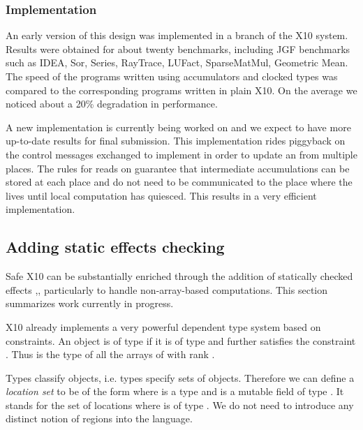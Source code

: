
\subsubsection{Implementation}
An early version of this design was implemented in a branch of the X10
system. Results were obtained for about twenty benchmarks, including
JGF benchmarks such as IDEA, Sor, Series, RayTrace, LUFact,
SparseMatMul, Geometric Mean.  The speed of the programs written using
accumulators and clocked types was compared to the corresponding
programs written in plain X10. On the average we noticed about a 20\%
degradation in performance. 

A new implementation is currently being worked on and we expect to
have more up-to-date results for final submission. This implementation
rides piggyback on the control messages exchanged to implement
 in order to update an  from multiple
places. The rules for reads on  guarantee that intermediate
accumulations can be stored at each place and do not need to be
communicated to the place where the  lives until local
computation has quiesced. 
This results in a very efficient implementation. 

\subsection{Adding static effects checking}

Safe X10 can be substantially enriched
through the addition of statically checked effects
\cite{Gifford:1986:IFI:319838.319848},\cite{DPJ}, particularly to
handle non-array-based computations. This section summarizes work
currently in progress.

X10 already implements a very powerful dependent type system based on
constraints. An object  is of type  if it is of
type  and further satisfies the constraint
. Thus  is the type of all
the arrays of  with rank .

Types classify objects, i.e.{} types specify sets of
objects. Therefore we can define a {\em location set} to be of the form
 where  is a type and  is a mutable field of
type . It stands for the set of locations  where
 is of type . We do not need to introduce any distinct
notion of regions into the language.

